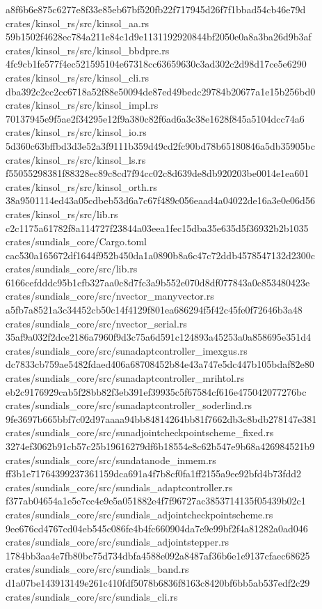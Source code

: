 \documentclass[
  10pt,
]{article}
\newenvironment{Shaded}{}{}
\newcommand{\NormalTok}[1]{#1}
\begin{document}
\begin{Shaded}
\begin{Highlighting}[]
\NormalTok{a8f6b6e875c6277e8f33e85eb67bf520fb22f717945d26f7f1bbad54cb46e79d  crates/kinsol\_rs/src/kinsol\_aa.rs}
\NormalTok{59b1502f4628ec784a211e84c1d9e1131192920844bf2050e0a8a3ba26d9b3af  crates/kinsol\_rs/src/kinsol\_bbdpre.rs}
\NormalTok{4fc9cb1fe577f4ec521595104e67318cc63659630c3ad302c2d98d17ce5e6290  crates/kinsol\_rs/src/kinsol\_cli.rs}
\NormalTok{dba392c2cc2cc6718a52f88e50094de87ed49bedc29784b20677a1e15b256bd0  crates/kinsol\_rs/src/kinsol\_impl.rs}
\NormalTok{70137945e9f5ae2f34295e12f9a380c82f6ad6a3c38e1628f845a5104dcc74a6  crates/kinsol\_rs/src/kinsol\_io.rs}
\NormalTok{5d360c63bffbd3d3e52a3f9111b359d49cd2fc90bd78b65180846a5db35905bc  crates/kinsol\_rs/src/kinsol\_ls.rs}
\NormalTok{f55055298381f88328ec89c8cd7f94cc02c8d639de8db920203be0014e1ea601  crates/kinsol\_rs/src/kinsol\_orth.rs}
\NormalTok{38a9501114ed43a05cdbeb53d6a7c67f489c056eaad4a04022de16a3e0e06d56  crates/kinsol\_rs/src/lib.rs}
\NormalTok{c2c1175a61782f8a114727f23844a03eea1fec15dba35e635d5f36932b2b1035  crates/sundials\_core/Cargo.toml}
\NormalTok{cac530a165672df1644f952b450da1a0890b8a6c47c72ddb4578547132d2300c  crates/sundials\_core/src/lib.rs}
\NormalTok{6166cefdddc95b1cfb327aa0c8d7fc3a9b552e070d8df077843a0c853480423e  crates/sundials\_core/src/nvector\_manyvector.rs}
\NormalTok{a5fb7a8521a3c34452cb50c14f4129f801ea686294f5f42c45fe0f72646b3a48  crates/sundials\_core/src/nvector\_serial.rs}
\NormalTok{35af9a032f2dce2186a7960f9d3c75a6d591c124893a45253a0a858695e351d4  crates/sundials\_core/src/sunadaptcontroller\_imexgus.rs}
\NormalTok{dc7833cb759ae5482fdaed406a68708452b84e43a747e5dc447b105bdaf82e80  crates/sundials\_core/src/sunadaptcontroller\_mrihtol.rs}
\NormalTok{eb2c9176929cab5f28bb82f3eb391ef39935c5f67584cf616e475042077276bc  crates/sundials\_core/src/sunadaptcontroller\_soderlind.rs}
\NormalTok{9fe3697b665bbf7c02d97aaaa94bb84814264bb81f7662db3c8bdb278147e381  crates/sundials\_core/src/sunadjointcheckpointscheme\_fixed.rs}
\NormalTok{3274ef3062b91cb57c25b19616279df6b18554e8c62b547e9b68a426984521b9  crates/sundials\_core/src/sundatanode\_inmem.rs}
\NormalTok{ff3b1e71764399237361159dca691a4f7b8cf0fa1ff2155a9ee92bfd4b73fdd2  crates/sundials\_core/src/sundials\_adaptcontroller.rs}
\NormalTok{f377ab04654a1e5e7cc4e9e5a051882e4f7f96727ac3853714135f05439b02c1  crates/sundials\_core/src/sundials\_adjointcheckpointscheme.rs}
\NormalTok{9ee676cd4767cd04eb545c086fe4b4fc660904da7e9e99bf2f4a81282a0ad046  crates/sundials\_core/src/sundials\_adjointstepper.rs}
\NormalTok{1784bb3aa4e7fb80bc75d734dbfa4588e092a8487af36b6e1e9137cfaec68625  crates/sundials\_core/src/sundials\_band.rs}
\NormalTok{d1a07be143913149e261c410fdf5078b6836f8163c8420bf6bb5ab537edf2c29  crates/sundials\_core/src/sundials\_cli.rs}

\end{Highlighting}
\end{Shaded}
\end{document}
